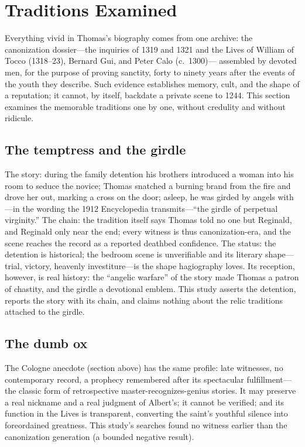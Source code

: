 \section{Traditions Examined}
\label{sec:traditions}

Everything vivid in Thomas's biography comes from one archive: the
canonization dossier---the inquiries of 1319 and 1321 and the Lives of
William of Tocco (1318--23), Bernard Gui, and Peter Calo (c.~1300)---
assembled by devoted men, for the purpose of proving sanctity, forty to
ninety years after the events of the youth they describe. Such evidence
establishes memory, cult, and the shape of a reputation; it cannot, by
itself, backdate a private scene to 1244. This section examines the
memorable traditions one by one, without credulity and without ridicule.

\subsection{The temptress and the girdle}

The story: during the family detention his brothers introduced a woman
into his room to seduce the novice; Thomas snatched a burning brand from
the fire and drove her out, marking a cross on the door; asleep, he was
girded by angels with---in the wording the 1912 Encyclopedia
transmits---``the girdle of perpetual virginity.'' The chain: the
tradition itself says Thomas told no one but Reginald, and Reginald only
near the end; every witness is thus canonization-era, and the scene
reaches the record as a reported deathbed confidence. The status: the
detention is historical; the bedroom scene is unverifiable and its
literary shape---trial, victory, heavenly investiture---is the shape
hagiography loves. Its reception, however, is real history: the
``angelic warfare'' of the story made Thomas a patron of chastity, and
the girdle a devotional emblem. This study asserts the detention,
reports the story with its chain, and claims nothing about the relic
traditions attached to the girdle.

\subsection{The dumb ox}

The Cologne anecdote (section above) has the same profile: late
witnesses, no contemporary record, a prophecy remembered after its
spectacular fulfillment---the classic form of retrospective
master-recognizes-genius stories. It may preserve a real nickname and a
real judgment of Albert's; it cannot be verified; and its function in
the Lives is transparent, converting the saint's youthful silence into
foreordained greatness. This study's searches found no witness earlier
than the canonization generation (a bounded negative result).

